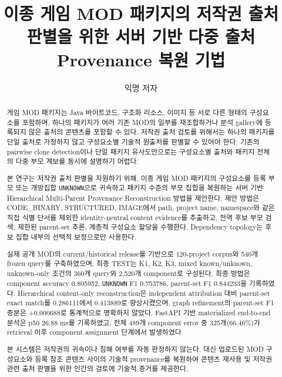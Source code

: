 \documentclass[runningheads]{llncs}
\begin{document}
\title{이종 게임 MOD 패키지의 저작권 출처 판별을 위한 서버 기반 다중 출처 Provenance 복원 기법}
\author{익명 저자}
\maketitle

\begin{abstract}
게임 MOD 패키지는 Java 바이트코드, 구조화 리소스, 이미지 등 서로 다른 형태의 구성요소를 포함하며, 하나의 패키지가 여러 기존 MOD의 일부를 재조합하거나 분석 gallery에 등록되지 않은 출처의 콘텐츠를 포함할 수 있다. 저작권 출처 검토를 위해서는 하나의 패키지를 단일 출처로 가정하지 않고 구성요소별 기술적 원출처를 판별할 수 있어야 한다. 기존의 pairwise clone detection이나 단일 패키지 유사도만으로는 구성요소별 출처와 패키지 전체의 다중 부모 계보를 동시에 설명하기 어렵다.

본 연구는 저작권 출처 판별을 지원하기 위해, 이종 게임 MOD 패키지의 구성요소를 등록 부모 또는 개방집합 \texttt{UNKNOWN}으로 귀속하고 패키지 수준의 부모 집합을 복원하는 서버 기반 Hierarchical Multi-Parent Provenance Reconstruction 방법을 제안한다. 제안 방법은 CODE\_BINARY, STRUCTURED, IMAGE에서 path, project name, namespace와 같은 직접 식별 단서를 제외한 identity-neutral content evidence를 추출하고, 전역 후보 부모 검색, 제한된 parent-set 추론, 계층적 구성요소 할당을 수행한다. Dependency topology는 후보 집합 내부의 선택적 보정으로만 사용한다.

실제 공개 MOD의 current/historical release를 기반으로 120-project corpus와 540개 frozen query를 구축하였으며, 최종 TEST는 K1, K2, K3, mixed known/unknown, unknown-only 조건의 360개 query와 2,520개 component로 구성된다. 최종 방법은 component accuracy 0.805952, \texttt{UNKNOWN} F1 0.753786, parent-set F1 0.844233을 기록하였다. Hierarchical content-only reconstruction은 independent attribution 대비 parent-set exact match를 0.286111에서 0.413889로 향상시켰으며, graph refinement의 parent-set F1 증분은 +0.000688로 통계적으로 명확하지 않았다. FastAPI 기반 materialized end-to-end 분석은 p50 26.88 ms를 기록하였고, 전체 489개 component error 중 325개(66.46\%)가 retrieval 이후 component assignment 단계에서 발생하였다.

본 시스템은 저작권의 귀속이나 침해 여부를 자동 판정하지 않는다. 대신 업로드된 MOD 구성요소와 등록 참조 콘텐츠 사이의 기술적 provenance를 복원하여 콘텐츠 재사용 및 저작권 관련 출처 판별을 위한 인간의 검토에 기술적 증거를 제공한다.

\end{abstract}
\end{document}
